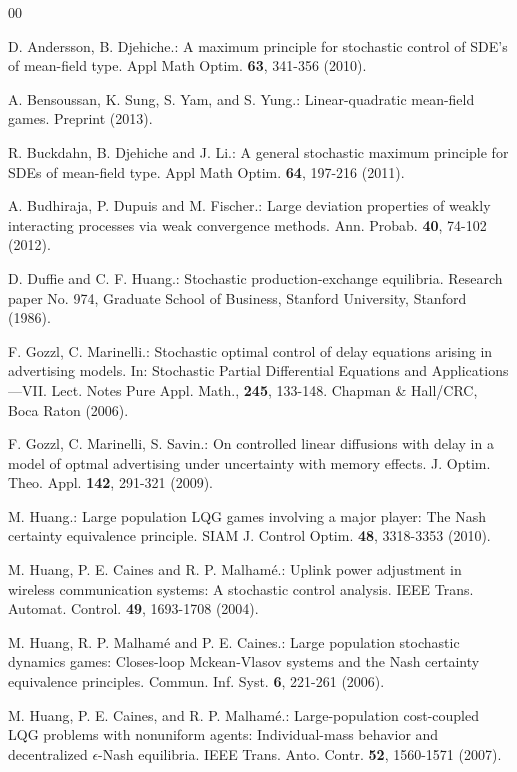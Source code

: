 \documentclass[11pt]{article}
\begin{document}
\begin{thebibliography}{00}

 D. Andersson, B. Djehiche.: A maximum principle for stochastic control
of SDE's of mean-field type. Appl Math Optim. \textbf{63}, 341-356
(2010).

 A. Bensoussan, K. Sung, S. Yam, and S. Yung.:
Linear-quadratic mean-field games. Preprint (2013).


 R. Buckdahn, B. Djehiche and J. Li.: A general stochastic
maximum principle for SDEs of mean-field type. Appl Math Optim.
\textbf{64}, 197-216 (2011).


 A. Budhiraja, P. Dupuis and M. Fischer.: Large deviation properties of
weakly interacting processes via weak convergence methods. Ann.
Probab. \textbf{40}, 74-102 (2012).


 D. Duffie and C. F. Huang.: Stochastic production-exchange
equilibria. Research paper No. 974, Graduate School of Business,
Stanford University, Stanford (1986).


 F. Gozzl, C. Marinelli.: Stochastic optimal control of delay
equations arising in advertising models. In: Stochastic Partial
Differential Equations and Applications---VII. Lect. Notes Pure
Appl. Math., \textbf{245}, 133-148. Chapman \& Hall/CRC, Boca Raton
(2006).

F. Gozzl, C. Marinelli, S. Savin.: On controlled linear
diffusions with delay in a model of optmal advertising under
uncertainty with memory effects. J. Optim. Theo. Appl. \textbf{142},
291-321 (2009).

 M. Huang.: Large population LQG games involving a major player: The Nash
certainty equivalence principle. SIAM J. Control Optim. \textbf{48},
3318-3353 (2010).

 M. Huang, P. E. Caines and R. P.
Malham\'{e}.: Uplink power adjustment in wireless
communication systems: A stochastic control analysis. IEEE Trans.
Automat. Control. \textbf{49}, 1693-1708 (2004).

 M. Huang, R. P.
Malham\'{e} and P. E. Caines.: Large population
stochastic dynamics games: Closes-loop Mckean-Vlasov systems and the
Nash certainty equivalence principles. Commun. Inf. Syst. \textbf{6},
221-261 (2006).

 M. Huang, P. E. Caines, and R. P.
Malham\'{e}.: Large-population cost-coupled LQG problems
with nonuniform agents: Individual-mass behavior and decentralized
$\epsilon$-Nash equilibria. IEEE Trans. Anto. Contr. \textbf{52},
1560-1571 (2007).


\end{thebibliography}
\end{document}
